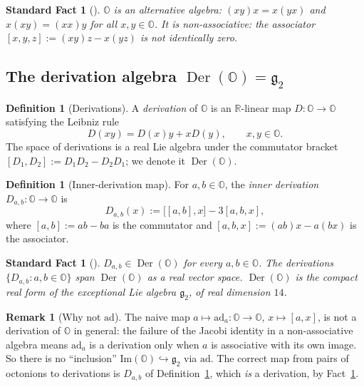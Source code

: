 \documentclass[11pt, a4paper]{amsart}
\newtheorem{fact}[theorem]{Standard Fact}
\theoremstyle{definition}
\newtheorem{definition}[theorem]{Definition}
\newtheorem{remark}[theorem]{Remark}
\newcommand{\R}{\mathbb{R}}
\newcommand{\OO}{\mathbb{O}}
\newcommand{\Der}{\operatorname{Der}}
\renewcommand{\Im}{\mathrm{Im}}
\begin{document}
\begin{fact}[\cite{BaezOctonions, SchaferNonassociative}]
\label{fact:octonions-alternative}
$\OO$ is an alternative algebra: $(xy)x = x(yx)$ and
$x(xy) = (xx)y$ for all $x, y \in \OO$. It is non-associative:
the associator $[x, y, z] := (xy)z - x(yz)$ is not identically
zero.
\end{fact}

\subsection{The derivation algebra $\Der(\OO) = \mathfrak{g}_2$}

\begin{definition}[Derivations]
\label{def:derivations}
A \emph{derivation} of $\OO$ is an $\R$-linear map
$D \colon \OO \to \OO$ satisfying the Leibniz rule
\[
  D(xy) = D(x) y + x D(y), \qquad x, y \in \OO.
\]
The space of derivations is a real Lie algebra under the
commutator bracket $[D_1, D_2] := D_1 D_2 - D_2 D_1$; we denote
it $\Der(\OO)$.
\end{definition}

\begin{definition}[Inner-derivation map]
\label{def:Dab}
For $a, b \in \OO$, the \emph{inner derivation}
$D_{a, b} \colon \OO \to \OO$ is
\[
  D_{a, b}(x) := \big[ [a, b], x \big] - 3 [a, b, x],
\]
where $[a, b] := ab - ba$ is the commutator and $[a, b, x] :=
(ab) x - a(bx)$ is the associator.
\end{definition}

\begin{fact}[\cite{BaezOctonions, SchaferNonassociative}]
\label{fact:Der-g2}
$D_{a, b} \in \Der(\OO)$ for every $a, b \in \OO$. The derivations
$\{D_{a, b} : a, b \in \OO\}$ span $\Der(\OO)$ as a real vector
space. $\Der(\OO)$ is the compact real form of the exceptional
Lie algebra $\mathfrak{g}_2$, of real dimension $14$.
\end{fact}

\begin{remark}[Why not $\mathrm{ad}$]
\label{rmk:not-ad}
The naive map $a \mapsto \mathrm{ad}_a \colon \OO \to \OO$, $x
\mapsto [a, x]$, is not a derivation of $\OO$ in general: the
failure of the Jacobi identity in a non-associative algebra means
$\mathrm{ad}_a$ is a derivation only when $a$ is associative with
its own image. So there is no ``inclusion''
$\Im(\OO) \hookrightarrow \mathfrak{g}_2$ via $\mathrm{ad}$. The
correct map from pairs of octonions to derivations is $D_{a, b}$
of Definition~\ref{def:Dab}, which \emph{is} a derivation, by
Fact~\ref{fact:Der-g2}.
\end{remark}
\end{document}
